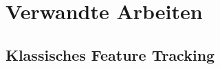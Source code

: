 \chapter{Verwandte Arbeiten}
\label{ch:verwandtearbeiten}

\section{Klassisches Feature Tracking}
\label{sec:KlassischesFeatureTracking}